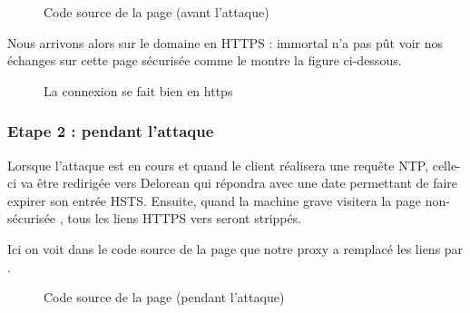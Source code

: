 \begin{figure}[H]
  \caption{Code source de la page (avant l'attaque)}
\end{figure}

Nous arrivons alors sur le domaine  en HTTPS : immortal n'a pas pût voir nos échanges sur cette page sécurisée comme le montre la figure ci-dessous.

\begin{figure}[H]
  \caption{La connexion se fait bien en https}
\end{figure}

\subsubsection{Etape 2 : pendant l'attaque}

Lorsque l'attaque est en cours et quand le client réalisera une requête NTP, celle-ci va être redirigée vers Delorean qui répondra avec une date permettant de faire expirer son entrée HSTS. Ensuite, quand la machine grave visitera la page non-sécurisée , tous les liens HTTPS vers  seront strippés.

Ici on voit dans le code source de la page que notre proxy a remplacé les liens  par .

\begin{figure}[H]
  \caption{Code source de la page (pendant l'attaque)}
\end{figure}

